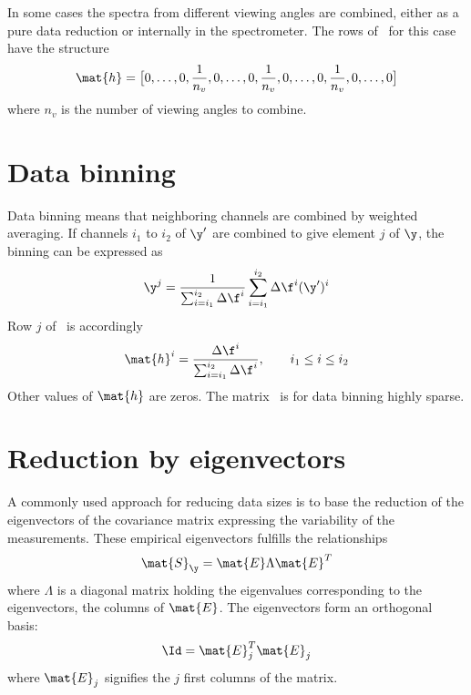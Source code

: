  In some cases the spectra from different viewing angles are combined,
 either as a pure data reduction or internally in the spectrometer.
 The rows of \Hd\ for this case have the structure
 \begin{equation}
   \mat{h} = \big[ 0,\dots,0,\frac{1}{n_v},0,\dots,0,\frac{1}{n_v},0,\dots,0,\frac{1}{n_v},0,\dots,0\big]
 \end{equation}
 where $n_v$ is the number of viewing angles to combine.


\section{Data binning}
 
 Data binning means that neighboring channels are combined by
 weighted averaging. If channels $i_1$ to $i_2$ of $\y'$ are combined to
 give element $j$ of $\y$, the binning can be expressed as
 \begin{equation}
   \y^j = \frac{1}{\sum_{i=i_1}^{i_2}{\Delta \f^i}} \sum_{i=i_1}^{i_2}{\Delta \f^i (\y')^i}
 \end{equation}
 Row $j$ of \Hd\ is accordingly
 \begin{equation}
   \mat{h}^i = \frac{\Delta \f^i}{\sum_{i=i_1}^{i_2}{\Delta \f^i}}, \qquad
    i_1\leq i \leq i_2
 \end{equation}
 Other values of $\mat{h}$ are zeros. The matrix \Hd\ is for data
 binning highly sparse.



\section{Reduction by eigenvectors}
 
 A commonly used approach for reducing data sizes is to base the
 reduction of the eigenvectors of the covariance matrix expressing the
 variability of the measurements. These empirical eigenvectors
 fulfills the relationships
 \begin{equation}
   \mat{S}_\y = \mat{E}\Lambda\mat{E}^T
 \end{equation}
 where $\Lambda$ is a diagonal matrix holding the eigenvalues
 corresponding to the eigenvectors, the columns of $\mat{E}$. The
 eigenvectors form an orthogonal basis:
 \begin{equation}
   \Id = \mat{E}^T_j\mat{E}_j
 \end{equation}
 where $\mat{E}_j$ signifies the $j$ first columns of the matrix.

